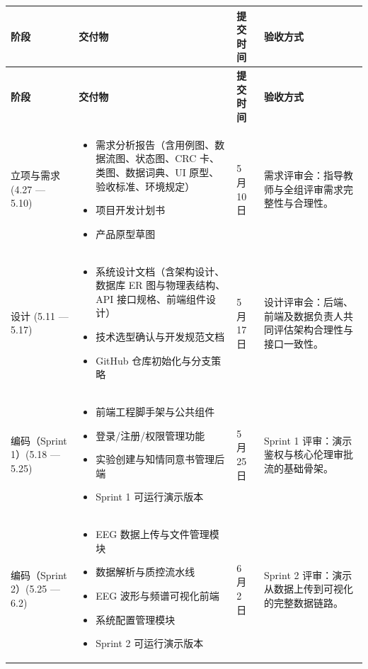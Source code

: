 \begin{longtable}{|p{24mm}|p{56mm}|p{28mm}|p{28mm}|}
\hline
\textbf{阶段} & \textbf{交付物} & \textbf{提交时间} & \textbf{验收方式} \\
\hline
\endfirsthead
\hline
\textbf{阶段} & \textbf{交付物} & \textbf{提交时间} & \textbf{验收方式} \\
\hline
\endhead

立项与需求 \newline(4.27 — 5.10) &
\begin{itemize}
  \item 需求分析报告（含用例图、数据流图、状态图、CRC 卡、类图、数据词典、UI 原型、验收标准、环境规定）
  \item 项目开发计划书
  \item 产品原型草图
\end{itemize} &
5 月 10 日 &
需求评审会：指导教师与全组评审需求完整性与合理性。 \\

\hline

设计 \newline(5.11 — 5.17) &
\begin{itemize}
  \item 系统设计文档（含架构设计、数据库 ER 图与物理表结构、API 接口规格、前端组件设计）
  \item 技术选型确认与开发规范文档
  \item GitHub 仓库初始化与分支策略
\end{itemize} &
5 月 17 日 &
设计评审会：后端、前端及数据负责人共同评估架构合理性与接口一致性。 \\

\hline

编码（Sprint 1）\newline(5.18 — 5.25) &
\begin{itemize}
  \item 前端工程脚手架与公共组件
  \item 登录/注册/权限管理功能
  \item 实验创建与知情同意书管理后端
  \item Sprint 1 可运行演示版本
\end{itemize} &
5 月 25 日 &
Sprint 1 评审：演示鉴权与核心伦理审批流的基础骨架。 \\

\hline

编码（Sprint 2）\newline(5.25 — 6.2) &
\begin{itemize}
  \item EEG 数据上传与文件管理模块
  \item 数据解析与质控流水线
  \item EEG 波形与频谱可视化前端
  \item 系统配置管理模块
  \item Sprint 2 可运行演示版本
\end{itemize} &
6 月 2 日 &
Sprint 2 评审：演示从数据上传到可视化的完整数据链路。 \\


\end{longtable}
